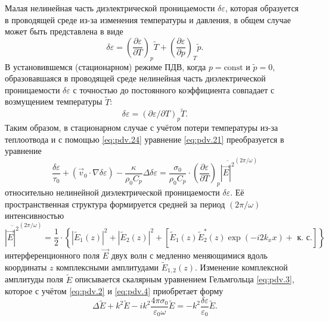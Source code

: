Малая нелинейная часть диэлектрической проницаемости $\delta \varepsilon$, которая образуется в проводящей среде из-за изменения температуры и давления, в общем случае может быть представлена в виде
\begin{equation}
	\label{eq:pdv.23}
	\delta \varepsilon=\left(\frac{\partial \varepsilon}{\partial T}\right)_{p} \tilde{T}+\left(\frac{\partial \varepsilon}{\partial p}\right)_{T} \tilde{p}.
\end{equation}
В установившемся (стационарном) режиме ПДВ, когда $p=\mathrm{const}$ и $\tilde{p} = 0$, образовавшаяся в проводящей среде нелинейная часть диэлектрической проницаемости $\delta \varepsilon$ с точностью до постоянного коэффициента совпадает с возмущением температуры $\tilde{T}$:
\begin{equation}
	\label{eq:pdv.24}
	\delta \varepsilon=(\partial \varepsilon / \partial T)_{p} \tilde{T}.
\end{equation}
Таким образом, в стационарном случае с учётом потери температуры из-за теплоотвода и с помощью \eqref{eq:pdv.24} уравнение \eqref{eq:pdv.21} преобразуется в уравнение
\begin{equation}
	\label{eq:pdv.25}
	\frac{\delta \varepsilon}{\tau_{0}}+\left(\overrightarrow{v}_{0} \cdot \nabla \delta \varepsilon\right)-\frac{\kappa}{\rho_{0} C_{p}} \Delta \delta \varepsilon=\frac{\sigma_{0}}{\rho_{0} C_{p}} \cdot\left(\frac{\partial \varepsilon}{\partial T}\right)_{p} \overline{|\vec{E}|^{2}}^{(2 \pi / \omega)}
\end{equation}
относительно нелинейной диэлектрической проницаемости $\delta \varepsilon$. Её пространственная структура формируется средней за период $(2 \pi / \omega)$ интенсивностью
\begin{equation}
	\label{eq:pdv.26}
	\overline{|\vec{E}|^{2}}^{(2 \pi / \omega)}=\frac{1}{2} \cdot\left\{\left|\tilde{E}_{1}(z)\right|^{2}+\left|\tilde{E}_{2}(z)\right|^{2}+\left[\tilde{E}_{1}(z) \tilde{E}_{2}^{*}(z) \exp \left(-i 2 k_{x} x\right)+\text{ к. с.}\right]\right\}
\end{equation}
интерференционного поля $\vec{E}$ двух волн с медленно меняющимися вдоль координаты $z$ комплексными амплитудами $\tilde{E}_{1,2}(z)$. Изменение комплексной амплитуды поля $\tilde{E}$ описывается скалярным уравнением Гельмгольца \eqref{eq:pdv.3}, которое с учётом \eqref{eq:pdv.2} и \eqref{eq:pdv.4} приобретает форму
\begin{equation}
	\label{eq:pdv.27}
	\Delta \tilde{E}+k^{2} \tilde{E}-i k^{2} \frac{4 \pi \sigma_{0}}{\varepsilon_{0} \omega} \tilde{E}=-k^{2} \frac{\delta \varepsilon}{\varepsilon_{0}} \tilde{E}.
\end{equation}
